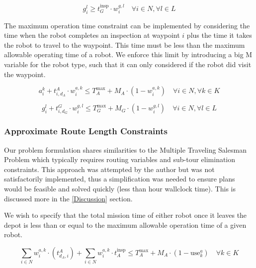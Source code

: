 \documentclass{article}
\begin{document}
				\begin{equation}
					g_i^l \geq t_G^{\text{insp}} \cdot w_i^{g,l} \quad \forall i \in N, \forall l \in L
				\end{equation}

				The maximum operation time constraint can be implemented by considering the time when the robot completes an inspection at waypoint $i$ plus the time it takes the robot to travel to the waypoint.
				This time must be less than the maximum allowable operating time of a robot. We enforce this limit by introducing a big M variable for the robot type, such that it can only considered if the robot did visit the waypoint.

				\begin{equation}
					a_i^k + t_{i,d_A}^{A} \cdot w_i^{a,k} \leq T_A^{\max} + M_A \cdot (1 - w_i^{a,k}) \quad \forall i \in N, \forall k \in K
				\end{equation}

				\begin{equation}
					g_i^l + t_{i,d_G}^{G} \cdot w_i^{g,l} \leq T_G^{\max} + M_G \cdot (1 - w_i^{g,l}) \quad \forall i \in N, \forall l \in L
				\end{equation}

			\subsubsection{Approximate Route Length Constraints}

				Our problem formulation shares similarities to the Multiple Traveling Salesman Problem which typically requires routing variables and sub-tour elimination constraints. 
				This approach was attempted by the author but was not satisfactorily implemented, thus a simplification was needed to ensure plans would be feasible and solved quickly (less than hour wallclock time). This is discussed more in the \ref{Discussion} section.

				We wish to specify that the total mission time of either robot once it leaves the depot is less than or equal to the maximum allowable operation time of a given robot. 				
				


				\begin{equation}
					\sum_{i \in N} w_i^{a,k} \cdot \left( t_{d_A,i}^{A}\right) + \sum_{i \in N} w_i^{a,k} \cdot t_A^{\text{insp}} \leq T_A^{\max} + M_A \cdot (1 - \text{use}_k^a) \quad \forall k \in K
				\end{equation}
\end{document}
